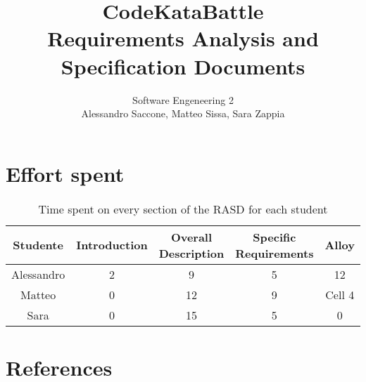 \documentclass[12pt,a4paper]{article}
\title{CodeKataBattle\\ Requirements Analysis and Specification Documents}
\author{Software Engeneering 2\\
       Alessandro Saccone, Matteo Sissa, Sara Zappia}
\begin{document}
\maketitle

\newpage









\section{Effort spent}
\begin{table}[h]
  \centering
  \begin{tabular}{|c|c|c|c|c|}
    \hline
     Studente & Introduction & Overall Description & Specific Requirements & Alloy \\
    \hline
    Alessandro & 2 & 9 & 5 & 12 \\
    \hline
    Matteo & 0 & 12 & 9 & Cell 4 \\
    \hline
    Sara & 0 & 15 & 5 & 0 \\
    \hline
  \end{tabular}
  \caption{Time spent on every section of the RASD for each student}
  \label{tab:effort}
\end{table}

\section{References}
%
%
\end{document}
